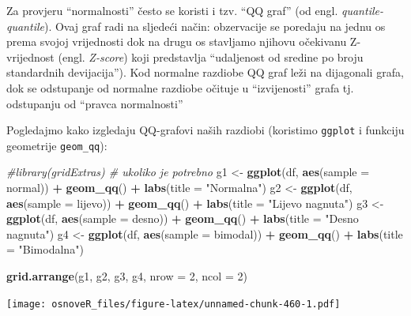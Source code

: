 \documentclass[]{book}
\newenvironment{Shaded}{\begin{snugshade}}{\end{snugshade}}
\newcommand{\KeywordTok}[1]{\textcolor[rgb]{0.13,0.29,0.53}{\textbf{#1}}}
\newcommand{\DataTypeTok}[1]{\textcolor[rgb]{0.13,0.29,0.53}{#1}}
\newcommand{\DecValTok}[1]{\textcolor[rgb]{0.00,0.00,0.81}{#1}}
\newcommand{\StringTok}[1]{\textcolor[rgb]{0.31,0.60,0.02}{#1}}
\newcommand{\CommentTok}[1]{\textcolor[rgb]{0.56,0.35,0.01}{\textit{#1}}}
\newcommand{\OperatorTok}[1]{\textcolor[rgb]{0.81,0.36,0.00}{\textbf{#1}}}
\newcommand{\NormalTok}[1]{#1}
\theoremstyle{definition}
\theoremstyle{definition}
\theoremstyle{definition}
\theoremstyle{remark}
\begin{document}
Za provjeru ``normalnosti'' često se koristi i tzv. ``QQ graf'' (od
engl. \emph{quantile-quantile}). Ovaj graf radi na sljedeći način:
obzervacije se poredaju na jednu os prema svojoj vrijednosti dok na
drugu os stavljamo njihovu očekivanu Z-vrijednost (engl. \emph{Z-score})
koji predstavlja ``udaljenost od sredine po broju standardnih
devijacija''). Kod normalne razdiobe QQ graf leži na dijagonali grafa,
dok se odstupanje od normalne razdiobe očituje u ``izvijenosti'' grafa
tj. odstupanju od ``pravca normalnosti''

Pogledajmo kako izgledaju QQ-grafovi naših razdiobi (koristimo
\texttt{ggplot} i funkciju geometrije \texttt{geom\_qq}):

\begin{Shaded}
\begin{Highlighting}[]
\CommentTok{#library(gridExtras)    # ukoliko je potrebno}
\NormalTok{g1 <-}\StringTok{ }\KeywordTok{ggplot}\NormalTok{(df, }\KeywordTok{aes}\NormalTok{(}\DataTypeTok{sample =}\NormalTok{ normal)) }\OperatorTok{+}\StringTok{ }\KeywordTok{geom_qq}\NormalTok{() }\OperatorTok{+}\StringTok{ }\KeywordTok{labs}\NormalTok{(}\DataTypeTok{title =} \StringTok{"Normalna"}\NormalTok{)}
\NormalTok{g2 <-}\StringTok{ }\KeywordTok{ggplot}\NormalTok{(df, }\KeywordTok{aes}\NormalTok{(}\DataTypeTok{sample =}\NormalTok{ lijevo)) }\OperatorTok{+}\StringTok{ }\KeywordTok{geom_qq}\NormalTok{() }\OperatorTok{+}\StringTok{ }\KeywordTok{labs}\NormalTok{(}\DataTypeTok{title =} \StringTok{"Lijevo nagnuta"}\NormalTok{)}
\NormalTok{g3 <-}\StringTok{ }\KeywordTok{ggplot}\NormalTok{(df, }\KeywordTok{aes}\NormalTok{(}\DataTypeTok{sample =}\NormalTok{ desno)) }\OperatorTok{+}\StringTok{ }\KeywordTok{geom_qq}\NormalTok{() }\OperatorTok{+}\StringTok{ }\KeywordTok{labs}\NormalTok{(}\DataTypeTok{title =} \StringTok{"Desno nagnuta"}\NormalTok{)}
\NormalTok{g4 <-}\StringTok{ }\KeywordTok{ggplot}\NormalTok{(df, }\KeywordTok{aes}\NormalTok{(}\DataTypeTok{sample =}\NormalTok{ bimodal)) }\OperatorTok{+}\StringTok{ }\KeywordTok{geom_qq}\NormalTok{() }\OperatorTok{+}\StringTok{ }\KeywordTok{labs}\NormalTok{(}\DataTypeTok{title =} \StringTok{"Bimodalna"}\NormalTok{)}

\KeywordTok{grid.arrange}\NormalTok{(g1, g2, g3, g4, }\DataTypeTok{nrow =} \DecValTok{2}\NormalTok{, }\DataTypeTok{ncol =} \DecValTok{2}\NormalTok{)}
\end{Highlighting}
\end{Shaded}

\texttt{[image: osnoveR\_files/figure-latex/unnamed-chunk-460-1.pdf]}
\end{document}
